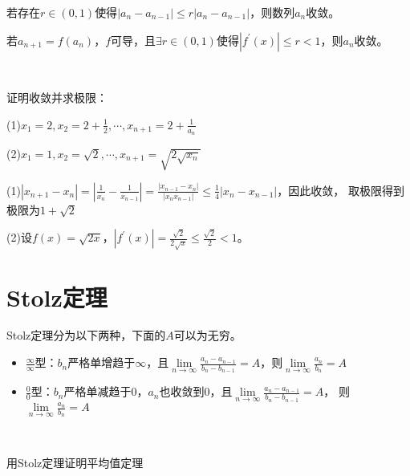 \begin{theorem}[压缩映射定理]
  若存在$r \in (0,1)$使得$|a_n - a_{n-1}| \leq r|a_n - a_{n-1}|$，则数列$a_n$收敛。
\end{theorem}

\begin{corollary}[导数判断压缩映射]
  若$a_{n+1} = f(a_n)$，$f$可导，且$\exists r \in (0,1)$使得$|f^{\prime}(x)| \leq r < 1$，则$a_n$收敛。
\end{corollary}

~

\begin{exercise}[两个经典循环式]
  证明收敛并求极限：

  (1)$x_1 = 2, x_2 = 2 + \frac{1}{2},\cdots, x_{n+1} = 2 + \frac{1}{a_n}$

  (2)$x_1 = 1, x_2 = \sqrt{2}, \cdots, x_{n+1} = \sqrt{2 \sqrt{x_n}}$
\end{exercise}

\begin{solution}
  (1)$|x_{n+1} - x_n| = |\frac{1}{x_n} - \frac{1}{x_{n-1}}| = \frac{|x_{n-1} - x_n|}{|x_nx_{n-1}|} \leq \frac{1}{4}|x_n - x_{n-1}|$，因此收敛，
  取极限得到极限为$1 + \sqrt{2}$

  (2)设$f(x) = \sqrt{2x}$，$|f^{\prime}(x)| = \frac{\sqrt{2}}{2 \sqrt{x}} \leq \frac{\sqrt{2}}{2} < 1$。
\end{solution}


\section{Stolz定理}


\begin{theorem}[Stolz定理]
  Stolz定理分为以下两种，下面的$A$可以为无穷。
  \begin{itemize}
  \item $\frac{\infty}{\infty}$型：$b_n$严格单增趋于$\infty$，且$\lim \limits _{n \rightarrow \infty} \frac{a_n - a_{n-1}}{b_n - b_{n-1}} = A$，则$\lim \limits _{n \rightarrow \infty} \frac{a_n}{b_n} = A$
  \item $\frac{0}{0}$型：$b_n$严格单减趋于$0$，$a_n$也收敛到$0$，且$\lim \limits _{n \rightarrow \infty} \frac{a_n - a_{n-1}}{b_n - b_{n-1}} = A$，
    则$\lim \limits _{n \rightarrow \infty} \frac{a_n}{b_n} = A$
  \end{itemize}
\end{theorem}

~

\begin{exercise}[直接使用]
  用Stolz定理证明平均值定理
\end{exercise}

